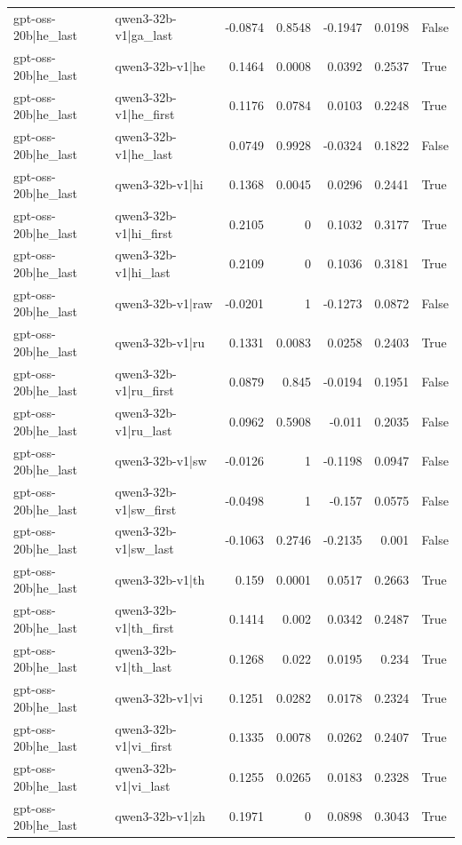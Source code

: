 \begin{table}
\begin{tabular}{l l r r r r l}
gpt-oss-20b|he_last & qwen3-32b-v1|ga_last & -0.0874 & 0.8548 & -0.1947 & 0.0198 & False \\
gpt-oss-20b|he_last & qwen3-32b-v1|he & 0.1464 & 0.0008 & 0.0392 & 0.2537 & True \\
gpt-oss-20b|he_last & qwen3-32b-v1|he_first & 0.1176 & 0.0784 & 0.0103 & 0.2248 & True \\
gpt-oss-20b|he_last & qwen3-32b-v1|he_last & 0.0749 & 0.9928 & -0.0324 & 0.1822 & False \\
gpt-oss-20b|he_last & qwen3-32b-v1|hi & 0.1368 & 0.0045 & 0.0296 & 0.2441 & True \\
gpt-oss-20b|he_last & qwen3-32b-v1|hi_first & 0.2105 & 0 & 0.1032 & 0.3177 & True \\
gpt-oss-20b|he_last & qwen3-32b-v1|hi_last & 0.2109 & 0 & 0.1036 & 0.3181 & True \\
gpt-oss-20b|he_last & qwen3-32b-v1|raw & -0.0201 & 1 & -0.1273 & 0.0872 & False \\
gpt-oss-20b|he_last & qwen3-32b-v1|ru & 0.1331 & 0.0083 & 0.0258 & 0.2403 & True \\
gpt-oss-20b|he_last & qwen3-32b-v1|ru_first & 0.0879 & 0.845 & -0.0194 & 0.1951 & False \\
gpt-oss-20b|he_last & qwen3-32b-v1|ru_last & 0.0962 & 0.5908 & -0.011 & 0.2035 & False \\
gpt-oss-20b|he_last & qwen3-32b-v1|sw & -0.0126 & 1 & -0.1198 & 0.0947 & False \\
gpt-oss-20b|he_last & qwen3-32b-v1|sw_first & -0.0498 & 1 & -0.157 & 0.0575 & False \\
gpt-oss-20b|he_last & qwen3-32b-v1|sw_last & -0.1063 & 0.2746 & -0.2135 & 0.001 & False \\
gpt-oss-20b|he_last & qwen3-32b-v1|th & 0.159 & 0.0001 & 0.0517 & 0.2663 & True \\
gpt-oss-20b|he_last & qwen3-32b-v1|th_first & 0.1414 & 0.002 & 0.0342 & 0.2487 & True \\
gpt-oss-20b|he_last & qwen3-32b-v1|th_last & 0.1268 & 0.022 & 0.0195 & 0.234 & True \\
gpt-oss-20b|he_last & qwen3-32b-v1|vi & 0.1251 & 0.0282 & 0.0178 & 0.2324 & True \\
gpt-oss-20b|he_last & qwen3-32b-v1|vi_first & 0.1335 & 0.0078 & 0.0262 & 0.2407 & True \\
gpt-oss-20b|he_last & qwen3-32b-v1|vi_last & 0.1255 & 0.0265 & 0.0183 & 0.2328 & True \\
gpt-oss-20b|he_last & qwen3-32b-v1|zh & 0.1971 & 0 & 0.0898 & 0.3043 & True \\

\end{tabular}
\end{table}
